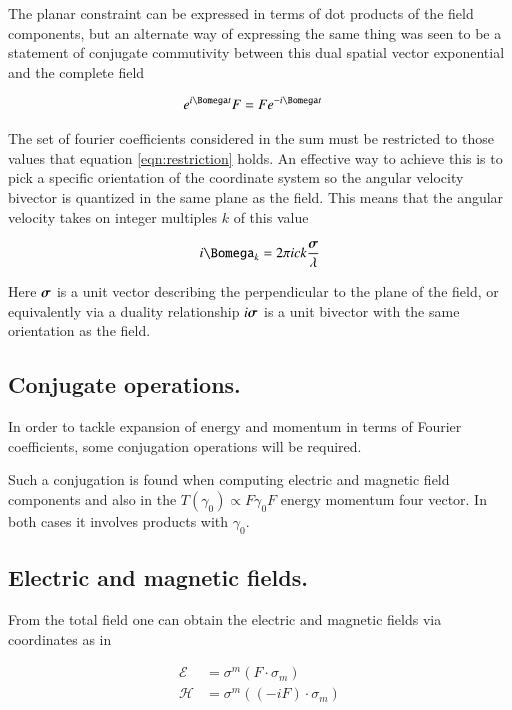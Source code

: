 \documentclass{article}
\newcommand{\EE}[0]{\boldsymbol{\mathcal{E}}}
\newcommand{\HH}[0]{\boldsymbol{\mathcal{H}}}
\begin{document}
The planar constraint can be expressed in terms of dot products of the field components, but an alternate way of expressing the same thing was seen to be
a statement of conjugate commutivity between this dual spatial vector exponential and the complete field

\begin{align}\label{eqn:restriction}
e^{ i \Bomega t} F &= F e^{ -i \Bomega t}
\end{align}

The set of fourier coefficients considered in the sum must be restricted to those values that equation \ref{eqn:restriction} holds.  An effective
way to achieve this is to
pick a specific orientation of the coordinate system so the angular
velocity bivector is quantized in the same plane as the field.  This means that
the angular velocity takes on integer multiples $k$ of this value

\begin{align}
i \Bomega_k = 2 \pi i c k \frac{\Bsigma}{\lambda}
\end{align}

Here $\boldsymbol{\sigma}$ is a unit vector describing the perpendicular to the plane of the field, or equivalently via a duality relationship $i \boldsymbol{\sigma}$ is a unit bivector with the same orientation as the field.

\subsection{ Conjugate operations. }

In order to tackle expansion of energy and momentum in terms of Fourier coefficients, some conjugation operations will be required.

Such a conjugation is found when computing electric and magnetic field components and also in the $T(\gamma_0) \propto F \gamma_0 F$ energy
momentum four vector.  In both cases it involves products with $\gamma_0$.

\subsection{ Electric and magnetic fields. }

From the total field one can
obtain the electric and magnetic fields via coordinates as in

%
\begin{align*}
\EE &= \sigma^m (F \cdot \sigma_m) \\
\HH &= \sigma^m ((-i F) \cdot \sigma_m)
\end{align*}
\end{document}
